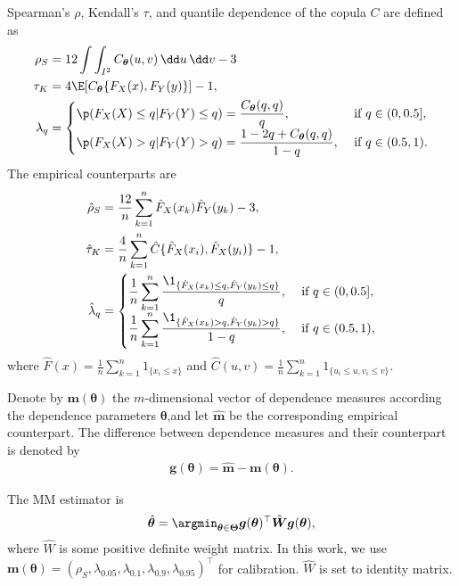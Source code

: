 Spearman's $\rho$, Kendall's $\tau$, and quantile dependence of the copula $C$ are defined as
\begin{align*}
  \rho_S &= 12 \int\int_{I^2} C_{\bm{\theta}}(u,v)\, \dd u\, \dd v-3\label{eq:rho_S}\\
  \tau_K &= 4\E[C_{\bm{\theta}}\{F_X(x), F_Y(y)\}]-1,\\
  \lambda_q &=
  \begin{cases}
    \p(F_X(X)\leq q| F_Y(Y)\leq q) = \displaystyle \frac{C_{\bm{\theta}}(q,q)}{q},
    &\text{ if } q\in (0,0.5],\\
    \p(F_X(X)>q|F_Y(Y)>q) =\displaystyle \frac{1-2q+C_{\bm{\theta}}(q,q)} {1-q},
    &\text{ if } q\in (0.5,1).
  \end{cases}
\end{align*}
The empirical counterparts are
\begin{align*}
  \hat\rho_S &= \frac{12}{n} \sum_{k=1}^n \hat F_X(x_k) \hat F_Y(y_k)
               -3,\\
  \hat\tau_K &= \frac{4}{n}\sum_{k=1}^n \hat{C}\{\hat{F}_X(x_i),\hat{F}_X(y_i)\} -1 ,\\
  \hat\lambda_q &=
                  \begin{cases}
                    \displaystyle\frac{1}{n} \sum_{k=1}^n \frac{\1_{\{\hat
                        F_X(x_k)\leq q, \hat F_Y(y_k)\leq q\}}} {q},
                    &\text { if } q\in (0, 0.5],\\
                    \displaystyle \frac{1}{n} \sum_{k=1}^n
                    \frac{\1_{\{\hat F_X(x_k)>q, \hat F_Y(y_k)>q\}}}
                    {1-q}, &\text { if } q\in (0.5,1),
                  \end{cases}
\end{align*}
where $\displaystyle \hat{F}(x) =
  \frac{1}{n}\sum_{k=1}^n 1_{\{x_i\leq x\}}$ and
$\displaystyle \hat{C}(u,v) = \frac{1}{n}\sum_{k=1}^n 1_{\{u_i\leq u, v_i\leq v\}}$. 

Denote by $\bm{m}(\bm{\theta})$ the $m$-dimensional vector of
dependence measures according the dependence parameters
$\bm{\theta}$,and let $\hat{\bm{m}}$ be the corresponding empirical
counterpart. 
The difference between dependence measures and their counterpart is denoted by
\begin{align*}
    \bm{g}(\bm{\theta}) = \hat{\bm{m}} - \bm{m}(\bm{\theta}).
\end{align*}

The MM estimator is
\begin{align*}
    \hat{\bm{\theta}} = \argmin_{\bm{\theta}\in \bm{\Theta}} \bm{g}(\bm{\theta})^\top
    \hat{\bm{W}}
     \bm{g}(\bm{\theta}),
\end{align*}
where $\hat{W}$ is some positive definite weight matrix.
In this work, we use
$\bm{m}(\bm{\theta}) = (\rho_S, \lambda_{0.05}, \lambda_{0.1}, 
\lambda_{0.9}, \lambda_{0.95})^\top$
for calibration.
$\hat{W}$ is set to identity matrix.

